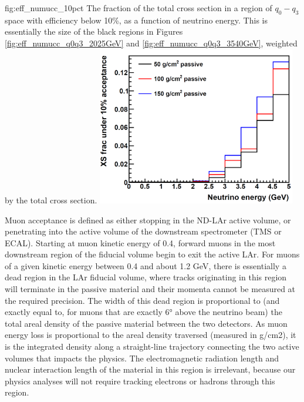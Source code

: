 \begin{dunefigure}{fig:eff_numucc_10pct}
{The fraction of the total cross section in a region of $q_0-q_3$ space with efficiency below 10\%, as a function of neutrino energy. This is essentially the size of the black regions in Figures \ref{fig:eff_numucc_q0q3_2025GeV} and \ref{fig:eff_numucc_q0q3_3540GeV}, weighted by the total cross section.}
\includegraphics[width=0.65\textwidth]{graphics/cryostat/numu_cc_efficiency_10pct.png}
\end{dunefigure}


Muon acceptance is defined as either stopping in the ND-LAr active volume, or penetrating into the active volume of the downstream spectrometer (TMS or ECAL). Starting at muon kinetic energy of 0.4, forward muons in the most downstream region of the fiducial volume begin to exit the active LAr. For muons of a given kinetic energy between 0.4 and about 1.2 GeV, there is essentially a dead region in the LAr fiducial volume, where tracks originating in this region will terminate in the passive material and their momenta cannot be measured at the required precision. The width of this dead region is proportional to (and exactly equal to, for muons that are exactly 6° above the neutrino beam) the total areal density of the passive material between the two detectors. As muon energy loss is proportional to the areal density traversed (measured in g/cm2), it is the integrated density along a straight-line trajectory connecting the two active volumes that impacts the physics. The electromagnetic radiation length and nuclear interaction length of the material in this region is irrelevant, because our physics analyses will not require tracking electrons or hadrons through this region.

